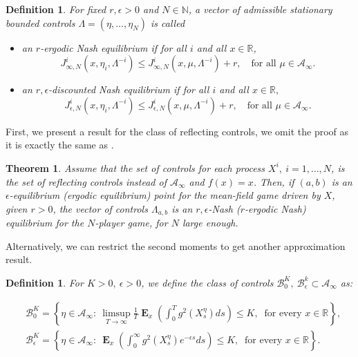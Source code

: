 \documentclass{article}
\newtheorem{theorem}[thm]{Theorem}
\newtheorem{definition}[thm]{Definition}
\newcommand{\R}{\mathbb{R}}%
\newcommand\E{\operatorname{\mathbf{E}}}
\begin{document}
\begin{definition}\label{D:epsilonNashequilibriumLEVY}
For fixed $r,\epsilon>0$ and $N\in\mathbb{N}$,  a vector of admissible stationary bounded controls
$\Lambda=(\eta,\dots ,\eta_N)$  is called 
\begin{itemize}
    \item[\rm{(i)}]
an $r$-ergodic Nash equilibrium if 
for all $i$ and all $x\in\R$,
$$
J_{\infty,N}^{i}(x,\eta_i, \Lambda^{-i}) \leq J^i_{\infty,N}(x,\mu,\Lambda^{-i} )+r, \quad\text{for all } \mu \in \mathcal{A}_{\infty}. 
$$
\item[\rm{(ii)}] an $r,\epsilon$-discounted Nash equilibrium if for all $i$ and all $x \in \mathbb{R},$
$$
J_{\epsilon,N}^{i}(x,\eta_i, \Lambda^{-i}) \leq J^i_{\epsilon,N}(x,\mu,\Lambda^{-i} )+r,\quad\text{for all } \mu \in \mathcal{A}_{\infty}. 
$$
\end{itemize}

\end{definition}
First, we present a result for the class of reflecting controls, we omit the proof as it is exactly the same as \cite[Theorem 5.2]{CMO}.

 \begin{theorem}
Assume that the set of controls for each process $X^i, \ i=1, \dots ,N$, 
is the set of reflecting controls instead of $ \mathcal{A}_{\infty}$  and $f(x)=x$.
Then, if $(a,b)$ is an $\epsilon$-equilibrium (ergodic equilibrium) point for the mean-field game driven by $X$,
given $r>0$,
the vector of controls $\Lambda_{a,b}$
is an $r,\epsilon$-Nash ($r$-ergodic Nash) equilibrium for the $N$-player game,
for $N$ large enough.
 \end{theorem}
Alternatively, we can restrict the second moments to get another approximation result.
%
%
%
\begin{definition}
    For $K>0, \ \epsilon>0$, we define the class of controls  $\mathcal{B}^K_0, \ \mathcal{B}^k_{\epsilon} \subset \mathcal{A}_\infty$ as:

\begin{align}
  &  \mathcal{B}^K_0= \left\lbrace \eta \in \mathcal{A}_{\infty}: \ \limsup_{T \to \infty}\frac{1}{T} \E_x \left(\int_0^T g^2(X^{\eta}_s)ds \right) \leq K , \ \text{ for every } x\in \mathbb{R} \right\rbrace , \nonumber \\
%
& \mathcal{B}_{\epsilon}^K = \left\lbrace \eta \in \mathcal{A}_{\infty}: \ \E_x \left(\int_0^\infty g^2(X^{\eta}_s)e^{-\epsilon s} ds\right)\leq K, \ \text{ for every } x \in \mathbb{R} \right\rbrace. \nonumber
\end{align}
%
\end{definition}
\end{document}
